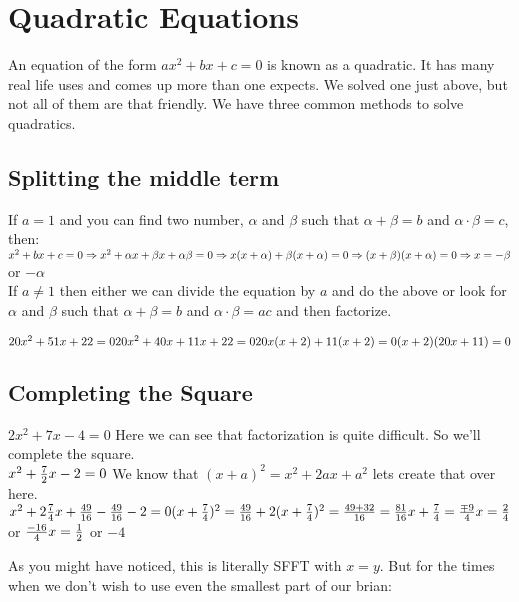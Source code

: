 \section{Quadratic Equations}
An equation of the form $ax^2+bx+c=0$ is known as a quadratic. It has many real life uses and comes up more than one expects. We solved one just above, but not all of them are that friendly. We have three common methods to solve quadratics.
\subsection{Splitting the middle term}
If $a=1$ and you can find two number, $\alpha$ and $\beta$ such that $\alpha + \beta = b$ and $\alpha \cdot \beta = c$, then:\\
$x^2+bx+c=0 \Rightarrow x^2+\alpha x +\beta x + \alpha \beta = 0\\
\Rightarrow x(x+\alpha)+\beta (x+\alpha)=0\\
\Rightarrow (x+\beta)(x+\alpha)=0\\
\Rightarrow x= -\beta$ or $-\alpha$\\
If $a \neq 1$ then either we can divide the equation by $a$ and do the above or look for $\alpha$ and $\beta$ such that $\alpha + \beta = b$ and $\alpha \cdot \beta = ac$ and then factorize. 
\begin{example}
    $20x^2+51x+22=0\\
    20x^2+40x+11x+22=0\\
    20x(x+2)+11(x+2)=0\\
    (x+2)(20x+11)=0$
\end{example}
\subsection{Completing the Square}
\begin{example}
    $2x^2+7x-4=0$ Here we can see that factorization is quite difficult. So we'll complete the square.\\
    $x^2+\frac{7}{2}x-2=0\\$ We know that $(x+a)^2=x^2+2ax+a^2$ lets create that over here.\\
    $x^2+2\frac{7}{4}x+\frac{49}{16}-\frac{49}{16}-2=0\\
    (x+\frac{7}{4})^2=\frac{49}{16}+2\\
    (x+\frac{7}{4})^2=\frac{49+32}{16}=\frac{81}{16}\\
    x+\frac{7}{4}=\frac{\mp 9}{4}\\
    x=\frac{2}{4}$ or $\frac{-16}{4}\\
    x=\frac{1}{2}$ or $-4$
\end{example}
As you might have noticed, this is literally SFFT with $x=y$. But for the times when we don't wish to use even the smallest part of our brian:

